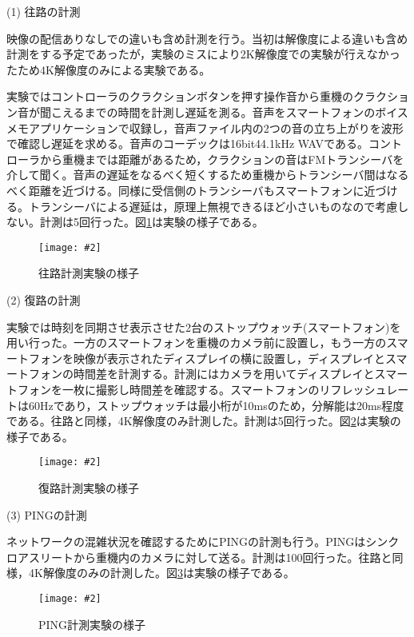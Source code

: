 \documentclass[a4paper,12pt]{jsarticle}
\newcommand{\figuref}[1]{図\ref{#1}}
\newcommand{\fig}[4][width=\textwidth]{
    \begin{figure}[!h]
    \begin{center}
    \texttt{[image: \#2]}
    \caption{#3}
    \label{#4}
    \vspace*{-1cm}
    \end{center}
    \end{figure}
}
\begin{document}
\begin{description}
  \item[(1) 往路の計測]
\end{description}\vspace{-1ex}

映像の配信ありなしでの違いも含め計測を行う。当初は解像度による違いも含め計測をする予定であったが，実験のミスにより2K解像度での実験が行えなかったため4K解像度のみによる実験である。

実験ではコントローラのクラクションボタンを押す操作音から重機のクラクション音が聞こえるまでの時間を計測し遅延を測る。音声をスマートフォンのボイスメモアプリケーションで収録し，音声ファイル内の2つの音の立ち上がりを波形で確認し遅延を求める。音声のコーデックは16bit44.1kHz WAVである。コントローラから重機までは距離があるため，クラクションの音はFMトランシーバを介して聞く。音声の遅延をなるべく短くするため重機からトランシーバ間はなるべく距離を近づける。同様に受信側のトランシーバもスマートフォンに近づける。トランシーバによる遅延は，原理上無視できるほど小さいものなので考慮しない。計測は5回行った。\figuref{test_tx}は実験の様子である。
\fig[width=7cm]{image/test_tx.jpg}{往路計測実験の様子}{test_tx}
\clearpage

\begin{description}
  \item[(2) 復路の計測]
\end{description}\vspace{-1ex}

実験では時刻を同期させ表示させた2台のストップウォッチ(スマートフォン)を用い行った。一方のスマートフォンを重機のカメラ前に設置し，もう一方のスマートフォンを映像が表示されたディスプレイの横に設置し，ディスプレイとスマートフォンの時間差を計測する。計測にはカメラを用いてディスプレイとスマートフォンを一枚に撮影し時間差を確認する。スマートフォンのリフレッシュレートは60Hzであり，ストップウォッチは最小桁が10msのため，分解能は20ms程度である。往路と同様，4K解像度のみ計測した。計測は5回行った。\figuref{test_rx}は実験の様子である。
\fig[width=7cm]{image/test_rx.jpg}{復路計測実験の様子}{test_rx}

\begin{description}
  \item[(3) PINGの計測]
\end{description}\vspace{-1ex}

ネットワークの混雑状況を確認するためにPINGの計測も行う。PINGはシンクロアスリートから重機内のカメラに対して送る。計測は100回行った。往路と同様，4K解像度のみの計測した。\figuref{test_ping}は実験の様子である。
\fig[width=7cm]{image/test_ping.jpg}{PING計測実験の様子}{test_ping}
\clearpage
\end{document}
